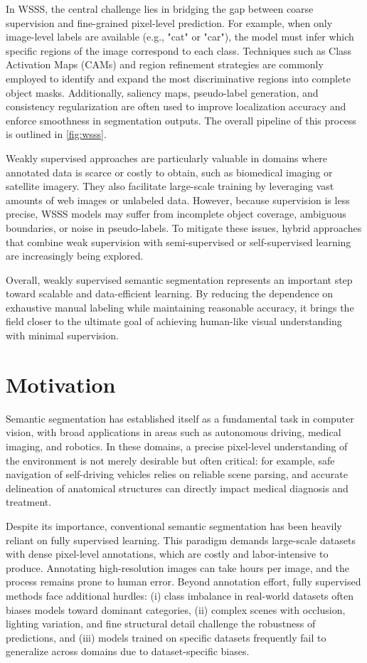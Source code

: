 In WSSS, the central challenge lies in bridging the gap between coarse supervision and fine-grained pixel-level prediction. For example, when only image-level labels are available (e.g., "cat" or "car"), the model must infer which specific regions of the image correspond to each class. Techniques such as Class Activation Maps (CAMs) and region refinement strategies are commonly employed to identify and expand the most discriminative regions into complete object masks. Additionally, saliency maps, pseudo-label generation, and consistency regularization are often used to improve localization accuracy and enforce smoothness in segmentation outputs. The overall pipeline of this process is outlined in \autoref{fig:wsss}.

Weakly supervised approaches are particularly valuable in domains where annotated data is scarce or costly to obtain, such as biomedical imaging or satellite imagery. They also facilitate large-scale training by leveraging vast amounts of web images or unlabeled data. However, because supervision is less precise, WSSS models may suffer from incomplete object coverage, ambiguous boundaries, or noise in pseudo-labels. To mitigate these issues, hybrid approaches that combine weak supervision with semi-supervised or self-supervised learning are increasingly being explored.

Overall, weakly supervised semantic segmentation represents an important step toward scalable and data-efficient learning. By reducing the dependence on exhaustive manual labeling while maintaining reasonable accuracy, it brings the field closer to the ultimate goal of achieving human-like visual understanding with minimal supervision.

\section{Motivation}
\label{sec:motivation}

Semantic segmentation has established itself as a fundamental task in computer vision, with broad applications in areas such as autonomous driving, medical imaging, and robotics. In these domains, a precise pixel-level understanding of the environment is not merely desirable but often critical: for example, safe navigation of self-driving vehicles relies on reliable scene parsing, and accurate delineation of anatomical structures can directly impact medical diagnosis and treatment.

Despite its importance, conventional semantic segmentation has been heavily reliant on fully supervised learning. This paradigm demands large-scale datasets with dense pixel-level annotations, which are costly and labor-intensive to produce. Annotating high-resolution images can take hours per image, and the process remains prone to human error. Beyond annotation effort, fully supervised methods face additional hurdles: (i) class imbalance in real-world datasets often biases models toward dominant categories, (ii) complex scenes with occlusion, lighting variation, and fine structural detail challenge the robustness of predictions, and (iii) models trained on specific datasets frequently fail to generalize across domains due to dataset-specific biases.

